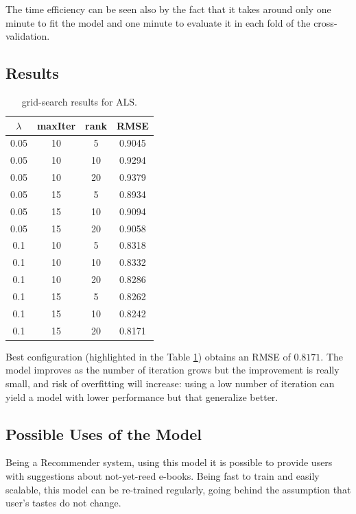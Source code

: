 \documentclass[fleqn,10pt]{SelfArx}
\begin{document}
The time efficiency can be seen also by the fact that it takes around only one minute to fit the model and one minute to evaluate it in each fold of the cross-validation.

\subsection{Results}
\begin{table}[!h]
    \centering
     \begin{tabular}{|c|c|c|c|}
          \hline
          $\lambda$ & maxIter & rank & RMSE\\
          \hline
          0.05 & 10 & 5  & 0.9045\\
          0.05 & 10 & 10 & 0.9294\\
          0.05 & 10 & 20 & 0.9379\\
          0.05 & 15 & 5  & 0.8934\\
          0.05 & 15 & 10 & 0.9094\\
          0.05 & 15 & 20 & 0.9058\\
          0.1  & 10 & 5  & 0.8318\\
          0.1  & 10 & 10 & 0.8332\\
          0.1  & 10 & 20 & 0.8286\\
          0.1  & 15 & 5  & 0.8262\\
          0.1  & 15 & 10 & 0.8242\\
          \rowcolor{orange} 
          0.1  & 15 & 20 & 0.8171\\
          \hline
     \end{tabular}
    \caption{grid-search results for ALS.}
    \label{tab:als_grid}
\end{table}

Best configuration (highlighted in the Table \ref{tab:als_grid}) obtains an RMSE of $0.8171$. 
The model improves as the number of iteration grows but the improvement is really small, and risk of overfitting will increase: using a low number of iteration can yield a model with lower performance but that generalize better.

\subsection{Possible Uses of the Model}
Being a Recommender system, using this model it is possible to provide users with suggestions about not-yet-reed e-books.
Being fast to train and easily scalable, this model can be re-trained regularly, going behind the assumption that user's tastes do not change.
\end{document}
